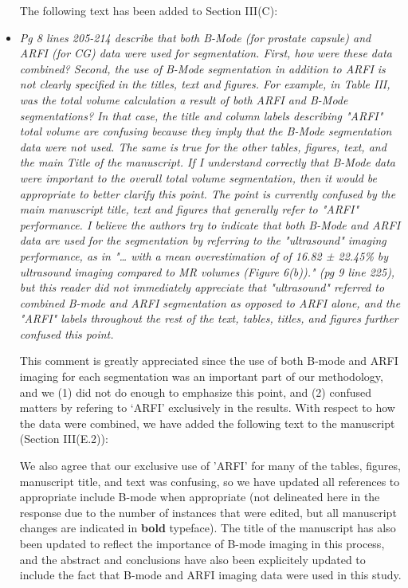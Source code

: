 \documentclass[10pt]{article}
\begin{document}
\begin{itemize}
    The following text has been added to Section III(C):

    

    \item \textit{Pg 8 lines 205-214 describe that both B-Mode (for prostate
            capsule) and ARFI (for CG) data were used for segmentation.  First,
            how were these data combined?  Second, the use of B-Mode
            segmentation in addition to ARFI is not clearly specified in the
            titles, text and figures.  For example, in Table III, was the total
            volume calculation a result of both ARFI and B-Mode segmentations?
            In that case, the title and column labels describing "ARFI" total
            volume are confusing because they imply that the B-Mode
            segmentation data were not used.  The same is true for the other
            tables, figures, text, and the main Title of the manuscript.  If I
            understand correctly that B-Mode data were important to the overall
            total volume segmentation, then it would be appropriate to better
            clarify this point.  The point is currently confused by the main
            manuscript title, text and figures that generally refer to "ARFI"
            performance.  I believe the authors try to indicate that both
            B-Mode and ARFI data are used for the segmentation by referring to
            the "ultrasound" imaging performance, as in "… with a mean
            overestimation of of 16.82 ± 22.45\% by ultrasound imaging compared
            to MR volumes (Figure 6(b))." (pg 9 line 225), but this reader did
            not immediately appreciate that "ultrasound" referred to combined
            B-mode and ARFI segmentation as opposed to ARFI alone, and the
            "ARFI" labels throughout the rest of the text, tables, titles, and
            figures further confused this point.}

    This comment is greatly appreciated since the use of both B-mode and ARFI
    imaging for each segmentation was an important part of our methodology, and
    we (1) did not do enough to emphasize this point, and (2) confused matters
    by refering to `ARFI' exclusively in the results.  With respect to how the
    data were combined, we have added the following text to the manuscript
    (Section III(E.2)):

    

    We also agree that our exclusive use of 'ARFI' for many of the tables,
    figures, manuscript title, and text was confusing, so we have updated all
    references to appropriate include B-mode when appropriate (not delineated
    here in the response due to the number of instances that were edited, but
    all manuscript changes are indicated in \textbf{bold} typeface).  The title
    of the manuscript has also been updated to reflect the importance of B-mode
    imaging in this process, and the abstract and conclusions have also been
    explicitely updated to include the fact that B-mode and ARFI imaging data
    were used in this study.


\end{itemize}
\end{document}
